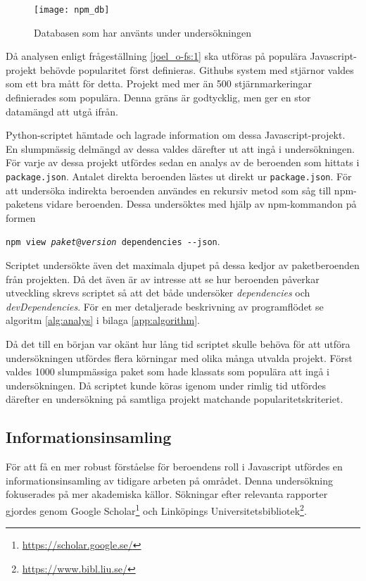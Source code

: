 \begin{figure}[ht]
  \centering
  \texttt{[image: npm\_db]}
  \caption{Databasen som har använts under undersökningen}
  \label{fig:dependency-db}
\end{figure}

Då analysen enligt frågeställning \ref{joel_o-fs:1} ska utföras på populära Javascript-projekt behövde popularitet först definieras. Githubs system med stjärnor valdes som ett bra mått för detta. Projekt med mer än 500 stjärnmarkeringar definierades som populära. Denna gräns är godtycklig, men ger en stor datamängd att utgå ifrån.

Python-scriptet hämtade och lagrade information om dessa Javascript-projekt. En slumpmässig delmängd av dessa valdes därefter ut att ingå i undersökningen. För varje av dessa projekt utfördes sedan en analys av de beroenden som hittats i \texttt{package.json}. Antalet direkta beroenden lästes ut direkt ur \texttt{package.json}. För att undersöka indirekta beroenden användes en rekursiv metod som såg till npm-paketens vidare beroenden. Dessa undersöktes med hjälp av npm-kommandon på formen

\begin{center}
  \texttt{npm view \textit{paket}@\textit{version} dependencies \hyphen\hyphen json}.
\end{center}

Scriptet undersökte även det maximala djupet på dessa kedjor av paketberoenden från projekten. Då det även är av intresse att se hur beroenden påverkar utveckling skrevs scriptet så att det både undersöker \textit{dependencies} och \textit{devDependencies}. För en mer detaljerade beskrivning av programflödet se algoritm \ref{alg:analys} i bilaga \ref{app:algorithm}.

Då det till en början var okänt hur lång tid scriptet skulle behöva för att utföra undersökningen utfördes flera körningar med olika många utvalda projekt. Först valdes 1000 slumpmässiga paket som hade klassats som populära att ingå i undersökningen. Då scriptet kunde köras igenom under rimlig tid utfördes därefter en undersökning på samtliga projekt matchande popularitetskriteriet.

\subsection{Informationsinsamling}
För att få en mer robust förståelse för beroendens roll i Javascript utfördes en informationsinsamling av tidigare arbeten på området. Denna undersökning fokuserades på mer akademiska källor. Sökningar efter relevanta rapporter gjordes genom Google Scholar\footnote{\url{https://scholar.google.se/}} och Linköpings Universitetsbibliotek\footnote{\url{https://www.bibl.liu.se/}}.

